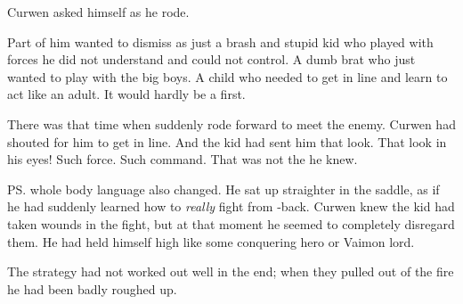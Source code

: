 \begin{comment}
\subsection{Curwen ponders \vertex}
\end{comment}
\new
{} Curwen asked himself as he rode. 

Part of him wanted to dismiss \Shireyo{} as just a brash and stupid kid who played with forces he did not understand and could not control. 
A dumb brat who just wanted to play with the big boys. 
A child who needed to get in line and learn to act like an adult. 
It would hardly be a first.


There was that time when \Shireyo{} suddenly rode forward to meet the enemy. 
Curwen had shouted for him to get in line. 
And the kid had sent him that look. 
That look in his eyes! 
Such force. 
Such command. 
That was not the \Shireyo{} he knew.

\ps{\Shireyo} whole body language also changed. 
He sat up straighter in the saddle, as if he had suddenly learned how to \emph{really} fight from \relc-back. 
Curwen knew the kid had taken wounds in the fight, but at that moment he seemed to completely disregard them. 
He had held himself high like some conquering hero or Vaimon lord.

The  strategy had not worked out well in the end; when they pulled \Shireyo{} out of the fire he had been badly roughed up. 

